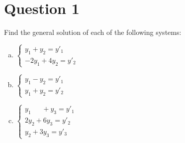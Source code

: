 \documentclass{article}
\begin{document}
\section*{Question 1}
Find the general solution of each of the following systems:
\begin{enumerate}[a.]
    \item 
    $\begin{cases} 
    y_1 + y_2 = y'_1 \\
    -2y_1 + 4y_2 = y'_2 
    \end{cases}$
    
    \item 
    $\begin{cases} 
    y_1 - y_2 = y'_1 \\
    y_1 + y_2 = y'_2 
    \end{cases}$
    
    \item 
    $\begin{cases} 
    y_1 \quad\;\; + y_3 = y'_1 \\
    2y_2 + 6y_3 = y'_2 \\
    y_2 + 3y_3 = y'_3 
    \end{cases}$
\end{enumerate}
\end{document}
